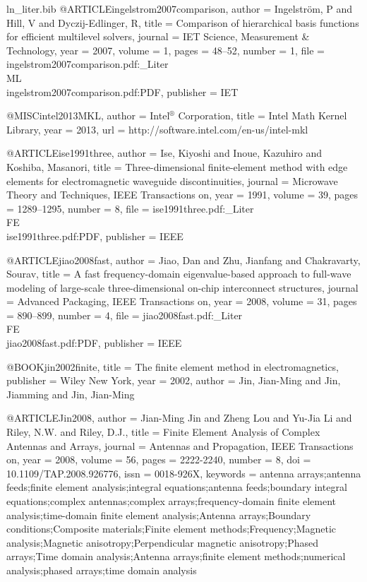 \begin{filecontents*}{ln_liter.bib}
@ARTICLE{ingelstrom2007comparison,
  author = {Ingelstr{\"o}m, P and Hill, V and Dyczij-Edlinger, R},
  title = {Comparison of hierarchical basis functions for efficient multilevel
	solvers},
  journal = {IET Science, Measurement \& Technology},
  year = {2007},
  volume = {1},
  pages = {48--52},
  number = {1},
  file = {ingelstrom2007comparison.pdf:_Liter\\ML\\ingelstrom2007comparison.pdf:PDF},
  publisher = {IET}
}

@MISC{intel2013MKL,
  author = {{Intel$^\circledR$ Corporation}},
  title = {Intel {M}ath {K}ernel {L}ibrary},
  year = {2013},
  url = {http://software.intel.com/en-us/intel-mkl}
}

@ARTICLE{ise1991three,
  author = {Ise, Kiyoshi and Inoue, Kazuhiro and Koshiba, Masanori},
  title = {Three-dimensional finite-element method with edge elements for electromagnetic
	waveguide discontinuities},
  journal = {Microwave Theory and Techniques, IEEE Transactions on},
  year = {1991},
  volume = {39},
  pages = {1289--1295},
  number = {8},
  file = {ise1991three.pdf:_Liter\\FE\\ise1991three.pdf:PDF},
  publisher = {IEEE}
}

@ARTICLE{jiao2008fast,
  author = {Jiao, Dan and Zhu, Jianfang and Chakravarty, Sourav},
  title = {A fast frequency-domain eigenvalue-based approach to full-wave modeling
	of large-scale three-dimensional on-chip interconnect structures},
  journal = {Advanced Packaging, IEEE Transactions on},
  year = {2008},
  volume = {31},
  pages = {890--899},
  number = {4},
  file = {jiao2008fast.pdf:_Liter\\FE\\jiao2008fast.pdf:PDF},
  publisher = {IEEE}
}

@BOOK{jin2002finite,
  title = {The finite element method in electromagnetics},
  publisher = {Wiley New York},
  year = {2002},
  author = {Jin, Jian-Ming and Jin, Jiamming and Jin, Jian-Ming}
}

@ARTICLE{Jin2008,
  author = {Jian-Ming Jin and Zheng Lou and Yu-Jia Li and Riley, N.W. and Riley,
	D.J.},
  title = {Finite Element Analysis of Complex Antennas and Arrays},
  journal = {Antennas and Propagation, IEEE Transactions on},
  year = {2008},
  volume = {56},
  pages = {2222-2240},
  number = {8},
  doi = {10.1109/TAP.2008.926776},
  issn = {0018-926X},
  keywords = {antenna arrays;antenna feeds;finite element analysis;integral equations;antenna
	feeds;boundary integral equations;complex antennas;complex arrays;frequency-domain
	finite element analysis;time-domain finite element analysis;Antenna
	arrays;Boundary conditions;Composite materials;Finite element methods;Frequency;Magnetic
	analysis;Magnetic anisotropy;Perpendicular magnetic anisotropy;Phased
	arrays;Time domain analysis;Antenna arrays;finite element methods;numerical
	analysis;phased arrays;time domain analysis}
}


\end{filecontents*}
